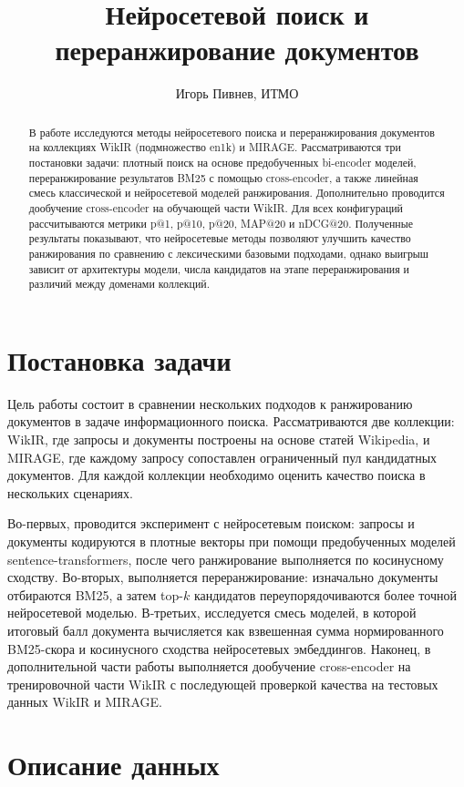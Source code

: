 \documentclass[11pt]{article}
\title{Нейросетевой поиск и переранжирование документов}
\author{Игорь Пивнев, ИТМО}
\begin{document}
\maketitle

\begin{abstract}
В работе исследуются методы нейросетевого поиска и переранжирования документов
на коллекциях WikIR (подмножество en1k) и MIRAGE. Рассматриваются три постановки
задачи: плотный поиск на основе предобученных bi-encoder моделей, переранжирование
результатов BM25 с помощью cross-encoder, а также линейная смесь классической и
нейросетевой моделей ранжирования. Дополнительно проводится дообучение cross-encoder
на обучающей части WikIR. Для всех конфигураций рассчитываются метрики p@1, p@10,
p@20, MAP@20 и nDCG@20. Полученные результаты показывают, что нейросетевые методы
позволяют улучшить качество ранжирования по сравнению с лексическими базовыми
подходами, однако выигрыш зависит от архитектуры модели, числа кандидатов на
этапе переранжирования и различий между доменами коллекций.
\end{abstract}

\section{Постановка задачи}

Цель работы состоит в сравнении нескольких подходов к ранжированию документов в
задаче информационного поиска. Рассматриваются две коллекции: WikIR, где запросы
и документы построены на основе статей Wikipedia, и MIRAGE, где каждому запросу
сопоставлен ограниченный пул кандидатных документов. Для каждой коллекции необходимо
оценить качество поиска в нескольких сценариях.

Во-первых, проводится эксперимент с нейросетевым поиском: запросы и документы
кодируются в плотные векторы при помощи предобученных моделей sentence-transformers,
после чего ранжирование выполняется по косинусному сходству. Во-вторых, выполняется
переранжирование: изначально документы отбираются BM25, а затем top-$k$ кандидатов
переупорядочиваются более точной нейросетевой моделью. В-третьих, исследуется смесь
моделей, в которой итоговый балл документа вычисляется как взвешенная сумма
нормированного BM25-скора и косинусного сходства нейросетевых эмбеддингов. Наконец,
в дополнительной части работы выполняется дообучение cross-encoder на тренировочной
части WikIR с последующей проверкой качества на тестовых данных WikIR и MIRAGE.

\section{Описание данных}
\end{document}
